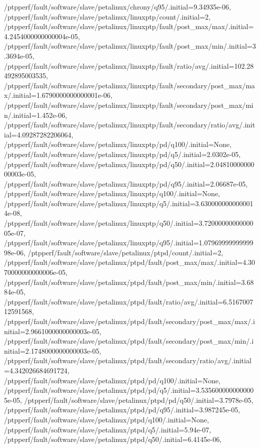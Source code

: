 {    /ptpperf/fault/software/slave/petalinux/chrony/q95/.initial=9.34935e-06,
    /ptpperf/fault/software/slave/petalinux/linuxptp/count/.initial=2,
    /ptpperf/fault/software/slave/petalinux/linuxptp/fault/post_max/max/.initial=4.2454000000000004e-05,
    /ptpperf/fault/software/slave/petalinux/linuxptp/fault/post_max/min/.initial=3.3694e-05,
    /ptpperf/fault/software/slave/petalinux/linuxptp/fault/ratio/avg/.initial=102.28492895003535,
    /ptpperf/fault/software/slave/petalinux/linuxptp/fault/secondary/post_max/max/.initial=1.6790000000000001e-06,
    /ptpperf/fault/software/slave/petalinux/linuxptp/fault/secondary/post_max/min/.initial=1.452e-06,
    /ptpperf/fault/software/slave/petalinux/linuxptp/fault/secondary/ratio/avg/.initial=4.09287282206064,
    /ptpperf/fault/software/slave/petalinux/linuxptp/pd/q100/.initial=None,
    /ptpperf/fault/software/slave/petalinux/linuxptp/pd/q5/.initial=2.0302e-05,
    /ptpperf/fault/software/slave/petalinux/linuxptp/pd/q50/.initial=2.0481000000000003e-05,
    /ptpperf/fault/software/slave/petalinux/linuxptp/pd/q95/.initial=2.06687e-05,
    /ptpperf/fault/software/slave/petalinux/linuxptp/q100/.initial=None,
    /ptpperf/fault/software/slave/petalinux/linuxptp/q5/.initial=3.6300000000000014e-08,
    /ptpperf/fault/software/slave/petalinux/linuxptp/q50/.initial=3.7200000000000005e-07,
    /ptpperf/fault/software/slave/petalinux/linuxptp/q95/.initial=1.0796999999999998e-06,
    /ptpperf/fault/software/slave/petalinux/ptpd/count/.initial=2,
    /ptpperf/fault/software/slave/petalinux/ptpd/fault/post_max/max/.initial=4.3070000000000006e-05,
    /ptpperf/fault/software/slave/petalinux/ptpd/fault/post_max/min/.initial=3.6884e-05,
    /ptpperf/fault/software/slave/petalinux/ptpd/fault/ratio/avg/.initial=6.516700712591568,
    /ptpperf/fault/software/slave/petalinux/ptpd/fault/secondary/post_max/max/.initial=2.9661000000000003e-05,
    /ptpperf/fault/software/slave/petalinux/ptpd/fault/secondary/post_max/min/.initial=2.1748000000000003e-05,
    /ptpperf/fault/software/slave/petalinux/ptpd/fault/secondary/ratio/avg/.initial=4.342026684691724,
    /ptpperf/fault/software/slave/petalinux/ptpd/pd/q100/.initial=None,
    /ptpperf/fault/software/slave/petalinux/ptpd/pd/q5/.initial=3.5356000000000005e-05,
    /ptpperf/fault/software/slave/petalinux/ptpd/pd/q50/.initial=3.7978e-05,
    /ptpperf/fault/software/slave/petalinux/ptpd/pd/q95/.initial=3.987245e-05,
    /ptpperf/fault/software/slave/petalinux/ptpd/q100/.initial=None,
    /ptpperf/fault/software/slave/petalinux/ptpd/q5/.initial=5.94e-07,
    /ptpperf/fault/software/slave/petalinux/ptpd/q50/.initial=6.4145e-06,
}
